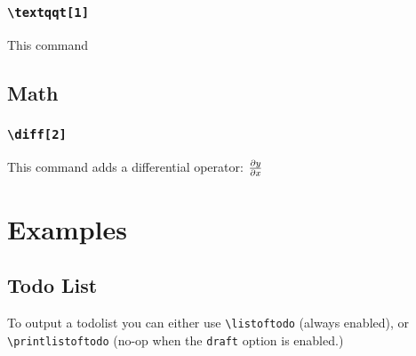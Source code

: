 \documentclass{article}
\begin{document}
\subsubsection{\texttt{\textbackslash textqqt[1]}}
    This command 

\subsection{Math}

\subsubsection{\texttt{\textbackslash diff[2]}}
    This command adds a differential operator: $\frac{\partial y}{\partial x}$

\section{Examples}
\subsection{Todo List}
To output a todolist you can either use \texttt{\textbackslash listoftodo} (always enabled), or \texttt{\textbackslash printlistoftodo} (no-op when the \texttt{draft} option is enabled.)

\printlistoftodo
\end{document}

